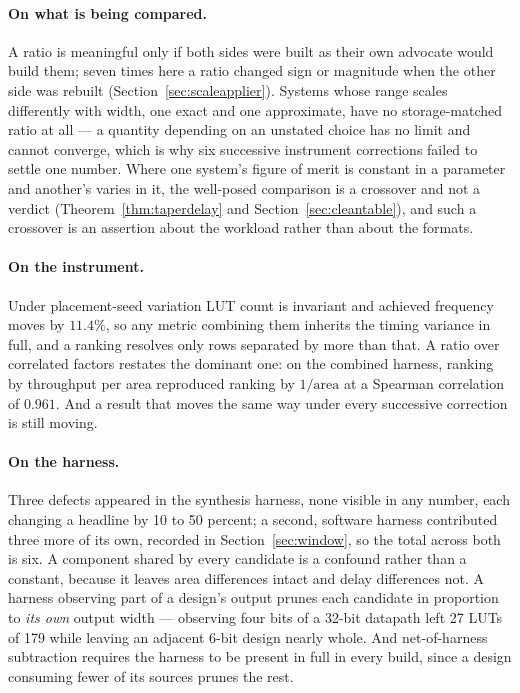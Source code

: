 \documentclass[11pt]{article}
\theoremstyle{definition}
\begin{document}
\paragraph{On what is being compared.} A ratio is meaningful only if both sides
were built as their own advocate would build them; seven times here a ratio
changed sign or magnitude when the other side was rebuilt
(Section~\ref{sec:scaleapplier}). Systems whose range scales differently with
width, one exact and one approximate, have no storage-matched ratio at all --- a
quantity depending on an unstated choice has no limit and cannot converge, which
is why six successive instrument corrections failed to settle one number. Where
one system's figure of merit is constant in a parameter and another's varies in
it, the well-posed comparison is a crossover and not a verdict
(Theorem~\ref{thm:taperdelay} and Section~\ref{sec:cleantable}), and such a
crossover is an assertion about the workload rather than about the formats.

\paragraph{On the instrument.} Under placement-seed variation LUT count is
invariant and achieved frequency moves by $11.4\%$, so any metric combining them
inherits the timing variance in full, and a ranking resolves only rows separated
by more than that. A ratio over correlated factors restates the dominant one: on
the combined harness, ranking by throughput per area reproduced ranking by
$1/\text{area}$ at a Spearman correlation of $0.961$. And a result that moves the
same way under every successive correction is still moving.

\paragraph{On the harness.} Three defects appeared in the synthesis harness, none
visible in any number, each changing a headline by 10 to 50 percent; a second,
software harness contributed three more of its own, recorded in
Section~\ref{sec:window}, so the total across both is six. A component shared by every
candidate is a confound rather than a constant, because it leaves area
differences intact and delay differences not. A harness observing part of a
design's output prunes each candidate in proportion to \emph{its own} output
width --- observing four bits of a 32-bit datapath left 27 LUTs of 179 while
leaving an adjacent 6-bit design nearly whole. And net-of-harness subtraction
requires the harness to be present in full in every build, since a design
consuming fewer of its sources prunes the rest.
\end{document}

